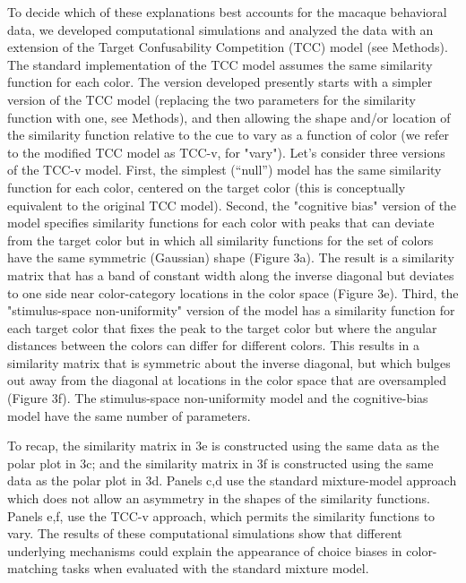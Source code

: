 To decide which of these explanations best accounts for the macaque behavioral data, we developed computational simulations and analyzed the data with an extension of the Target Confusability Competition (TCC) model \citep{schurgin_psychophysical_2020} (see Methods). 
The standard implementation of the TCC model assumes the same similarity function for each color. The version developed presently starts with a simpler version of the TCC model (replacing the two parameters for the similarity function with one, see Methods), and then allowing the shape and/or location of the similarity function relative to the cue to vary as a function of color (we refer to the modified TCC model as TCC-v, for "vary"). Let's consider three versions of the TCC-v model. First, the simplest (“null”) model has the same similarity function for each color, centered on the target color (this is conceptually equivalent to the original TCC model). Second, the "cognitive bias" version of the model specifies similarity functions for each color with peaks that can deviate from the target color but in which all similarity functions for the set of colors have the same symmetric (Gaussian) shape (Figure 3a). The result is a similarity matrix that has a band of constant width along the inverse diagonal but deviates to one side near color-category locations in the color space (Figure 3e). Third, the "stimulus-space non-uniformity" version of the model has a similarity function for each target color that fixes the peak to the target color but where the angular distances between the colors can differ for different colors. This results in a similarity matrix that is symmetric about the inverse diagonal, but which bulges out away from the diagonal at locations in the color space that are oversampled (Figure 3f). The stimulus-space non-uniformity model and the cognitive-bias model have the same number of parameters. 

To recap, the similarity matrix in 3e is constructed using the same data as the polar plot in 3c; and the similarity matrix in 3f is constructed using the same data as the polar plot in 3d. Panels c,d use the standard mixture-model approach which does not allow an asymmetry in the shapes of the similarity functions. Panels e,f, use the TCC-v approach, which permits the similarity functions to vary. The results of these computational simulations show that different underlying mechanisms could explain the appearance of choice biases in color-matching tasks when evaluated with the standard mixture model.

